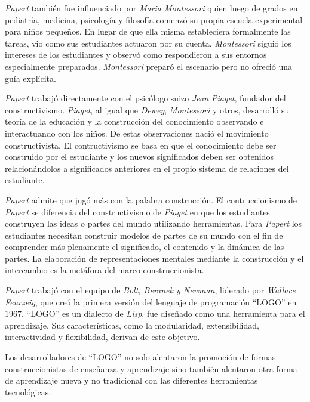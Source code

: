 \textit{Papert} también fue influenciado por \textit{Maria Montessori} quien
luego de grados en pediatría, medicina, psicología y filosofía comenzó su propia
escuela experimental para niños pequeños. En lugar de que ella misma
estableciera formalmente las tareas, vio como sus estudiantes actuaron por su
cuenta. \textit{Montessori} siguió los intereses de los estudiantes y observó como
respondieron a sus entornos especialmente preparados. \textit{Montessori}
preparó el escenario pero no ofreció una guía explícita\cite{historia:2014}.

\textit{Papert} trabajó directamente con el psicólogo suizo \textit{Jean
    Piaget}, fundador del constructivismo. \textit{Piaget}, al igual que
\textit{Dewey}, \textit{Montessori} y otros, desarrolló su teoría de la
educación y la construcción del conocimiento observando e interactuando con los
niños. De estas observaciones nació el movimiento constructivista. El
contructivismo se basa en que el conocimiento debe ser construido por el
estudiante y los nuevos significados deben ser obtenidos relacionándolos a
significados anteriores en el propio sistema de relaciones del
estudiante\cite{historia:2014}. 

\textit{Papert} admite que jugó más con la palabra construcción. El
contruccionismo de \textit{Papert} se diferencia del constructivismo de
\textit{Piaget} en que los estudiantes construyen las ideas o partes del mundo
utilizando herramientas. Para \textit{Papert} los estudiantes necesitan
construir modelos de partes de su mundo con el fin de comprender más plenamente
el significado, el contenido y la dinámica de las partes. La elaboración de
representaciones mentales mediante la construcción y el intercambio es la
metáfora del marco construccionista\cite{historia:2014}.

\textit{Papert} trabajó con el equipo de \textit{Bolt, Beranek y Newman},
liderado por \textit{Wallace Feurzeig}, que creó la primera versión del lenguaje
de programación \enquote{LOGO} en $1967$. \enquote{LOGO} es un dialecto de
\textit{Lisp}, fue diseñado como una herramienta para el aprendizaje. Sus
características, como la modularidad, extensibilidad, interactividad y
flexibilidad, derivan de este objetivo\cite{logo:sg}.

Los desarrolladores de \enquote{LOGO} no solo alentaron la promoción de formas
construccionistas de enseñanza y aprendizaje sino también alentaron otra forma
de aprendizaje nueva y no tradicional con las diferentes herramientas
tecnológicas\cite{historia:2014}. 

